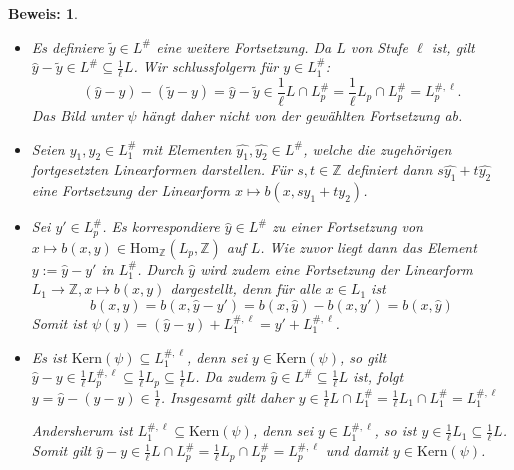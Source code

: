 \documentclass[12pt,a4paper,halfparskip,headsepline,bibtotocnumbered]{scrreprt}
\theoremstyle{nummermitklammern}
\theoremstyle{nonumberbreak}
\newtheorem{beweis}{Beweis:}
\newcommand{\Z}{\mathbb{Z}}
\begin{document}
\begin{beweis}
	\begin{itemize}[align=left, leftmargin = *]
		\item[Wohldefiniert:] Es definiere $\tilde{y} \in L^\#$ eine weitere Fortsetzung. Da $L$ von Stufe $\ell$ ist, gilt $\hat{y} - \tilde{y} \in L^\# \subseteq \frac{1}{\ell} L$. Wir schlussfolgern für $y \in L_1^\#$:
			\begin{equation*}
				(\hat{y} - y) - (\tilde{y} - y) = \hat{y} - \tilde{y} \in \frac{1}{\ell} L \cap L_p^\# = \frac{1}{\ell} L_p \cap L_p^\# = L_p^{\#,\ell}.
			\end{equation*}
			Das Bild unter $\psi$ hängt daher nicht von der gewählten Fortsetzung ab.
		\item[Linearität:] Seien $y_1, y_2 \in L_1^\#$ mit Elementen $\hat{y_1}, \hat{y_2} \in L^\#$, welche die zugehörigen fortgesetzten Linearformen darstellen. Für $s,t \in \Z$ definiert dann $s \hat{y_1} + t \hat{y_2}$ eine Fortsetzung der Linearform $x \mapsto b(x, s y_1 + t y_2)$.
		\item[Surjektivität:] Sei $y' \in L_p^\#$. Es korrespondiere $\hat{y} \in L^\#$ zu einer Fortsetzung von\linebreak
		$x \mapsto b(x,y) \in \text{Hom}_\Z(L_p, \Z)$ auf $L$. Wie zuvor liegt dann das Element $y := \hat{y} - y'$ in $L_1^\#$. Durch $\hat{y}$ wird zudem eine Fortsetzung der Linearform $L_1 \rightarrow \Z, x \mapsto b(x,y)$ dargestellt, denn für alle $x \in L_1$ ist
			\begin{equation*}
				b(x,y) = b(x, \hat{y} - y') = b(x, \hat{y}) - b(x, y') = b(x, \hat{y})
			\end{equation*}
			Somit ist $\psi(y) = (\hat{y} - y) + L_1^{\#, \ell} = y' + L_1^{\#, \ell}$.
		\item[Kern:] Es ist $\text{Kern}(\psi) \subseteq L_1^{\#, \ell}$, denn sei $y \in \text{Kern}(\psi)$, so gilt $\hat{y} - y \in \frac{1}{\ell}L_p^{\#, \ell} \subseteq \frac{1}{\ell} L_p \subseteq \frac{1}{\ell} L$. Da zudem $\hat{y} \in L^\# \subseteq \frac{1}{\ell} L$ ist, folgt $y = \hat{y} - (\hat{y} - y) \in \frac{1}{\ell}$. Insgesamt gilt daher\linebreak
			$y \in \frac{1}{\ell}L \cap L_1^\# = \frac{1}{\ell} L_1 \cap L_1^\# = L_1^{\#, \ell}$\par
			Andersherum ist $L_1^{\#, \ell} \subseteq \text{Kern}(\psi)$, denn sei $y \in L_1^{\#, \ell}$, so ist $y \in \frac{1}{\ell} L_1 \subseteq \frac{1}{\ell}L$. Somit gilt $\hat{y} - y \in \frac{1}{\ell} L \cap L_p^\# = \frac{1}{\ell} L_p \cap L_p^\# = L_p^{\#, \ell}$ und damit $y \in \text{Kern}(\psi)$.

\end{itemize}
\end{beweis}
\end{document}
